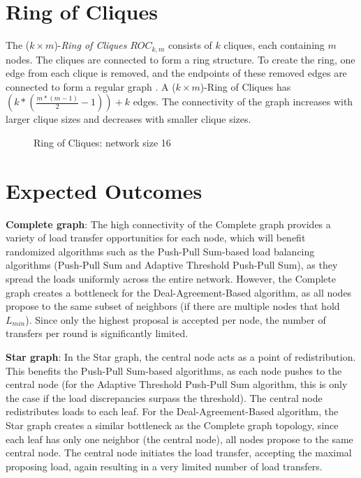 \section{Ring of Cliques}\label{sec:2ringofcliquegraph}
The ($k \times m$)-\textit{Ring of Cliques} $ROC_{k,m}$ consists of $k$ cliques, each containing $m$ nodes. The cliques are connected to form a ring structure. To create the ring, one edge from each clique is removed, and the endpoints of these removed edges are connected to form a regular graph \cite{Mahlmann2010}. A ($k \times m$)-Ring of Cliques has $\left( k * \left(\frac{m * (m - 1)}{2}-1 \right) \right)+k$ edges. The connectivity of the graph increases with larger clique sizes and decreases with smaller clique sizes.

\begin{figure}[H]
    \centering
    \scalebox{1}{}
    \caption{Ring of Cliques: network size 16}
    \label{fig:ringofcliquesDemo}
\end{figure}

\section{Expected Outcomes}\label{sec:expectedoutcome}
\textbf{Complete graph}: The high connectivity of the Complete graph provides a variety of load transfer opportunities for each node, which will benefit randomized algorithms such as the Push-Pull Sum-based load balancing algorithms (Push-Pull Sum and Adaptive Threshold Push-Pull Sum), as they spread the loads uniformly across the entire network. However, the Complete graph creates a bottleneck for the Deal-Agreement-Based algorithm, as all nodes propose to the same subset of neighbors (if there are multiple nodes that hold $L_{min}$). Since only the highest proposal is accepted per node, the number of transfers per round is significantly limited.

\textbf{Star graph}: In the Star graph, the central node acts as a point of redistribution. This benefits the Push-Pull Sum-based algorithms, as each node pushes to the central node (for the Adaptive Threshold Push-Pull Sum algorithm, this is only the case if the load discrepancies surpass the threshold). The central node redistributes loads to each leaf. For the Deal-Agreement-Based algorithm, the Star graph creates a similar bottleneck as the Complete graph topology, since each leaf has only one neighbor (the central node), all nodes propose to the same central node. The central node initiates the load transfer, accepting the maximal proposing load, again resulting in a very limited number of load transfers.

